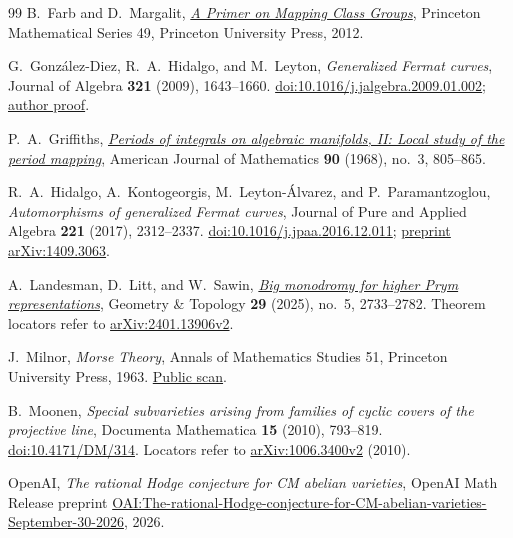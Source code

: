\documentclass[11pt]{article}
\theoremstyle{plain}
\theoremstyle{definition}
\theoremstyle{remark}
\numberwithin{equation}{section}
\begin{document}
\begin{thebibliography}{99}
B.~Farb and D.~Margalit,
\href{https://doi.org/10.1515/9781400839049}{\emph{A Primer on Mapping Class Groups}},
Princeton Mathematical Series 49, Princeton University Press, 2012.

G.~Gonz\'alez-Diez, R.~A.~Hidalgo, and M.~Leyton,
\emph{Generalized Fermat curves},
Journal of Algebra \textbf{321} (2009), 1643--1660.
\href{https://doi.org/10.1016/j.jalgebra.2009.01.002}{doi:10.1016/j.jalgebra.2009.01.002};
\href{https://verso.mat.uam.es/~gabino.gonzalez/GenFerCurves.pdf}{author proof}.

P.~A.~Griffiths,
\href{https://doi.org/10.2307/2373485}{\emph{Periods of integrals on algebraic manifolds, II: Local study of the period mapping}},
American Journal of Mathematics \textbf{90} (1968), no.~3, 805--865.

R.~A.~Hidalgo, A.~Kontogeorgis, M.~Leyton-\'Alvarez, and
P.~Paramantzoglou,
\emph{Automorphisms of generalized Fermat curves},
Journal of Pure and Applied Algebra \textbf{221} (2017), 2312--2337.
\href{https://doi.org/10.1016/j.jpaa.2016.12.011}{doi:10.1016/j.jpaa.2016.12.011};
\href{https://arxiv.org/pdf/1409.3063}{preprint arXiv:1409.3063}.

A.~Landesman, D.~Litt, and W.~Sawin,
\href{https://doi.org/10.2140/gt.2025.29.2733}{\emph{Big monodromy for higher Prym representations}},
Geometry \& Topology \textbf{29} (2025), no.~5, 2733--2782.
Theorem locators refer to
\href{https://arxiv.org/abs/2401.13906v2}{arXiv:2401.13906v2}.

J.~Milnor,
\emph{Morse Theory},
Annals of Mathematics Studies 51,
Princeton University Press, 1963.
\href{https://math.stanford.edu/~ralph/math215b/Milnor.pdf}{Public scan}.

B.~Moonen,
\emph{Special subvarieties arising from families of cyclic covers of
the projective line},
Documenta Mathematica \textbf{15} (2010), 793--819.
\href{https://doi.org/10.4171/DM/314}{doi:10.4171/DM/314}.
Locators refer to
\href{https://arxiv.org/pdf/1006.3400v2}{arXiv:1006.3400v2} (2010).

OpenAI,
\emph{The rational Hodge conjecture for CM abelian varieties},
OpenAI Math Release preprint
\href{https://github.com/openai/math/blob/main/preprints/The-rational-Hodge-conjecture-for-CM-abelian-varieties-September-30-2026/paper.pdf}{OAI:The-rational-Hodge-conjecture-for-CM-abelian-varieties-September-30-2026},
2026.


\end{thebibliography}
\end{document}
